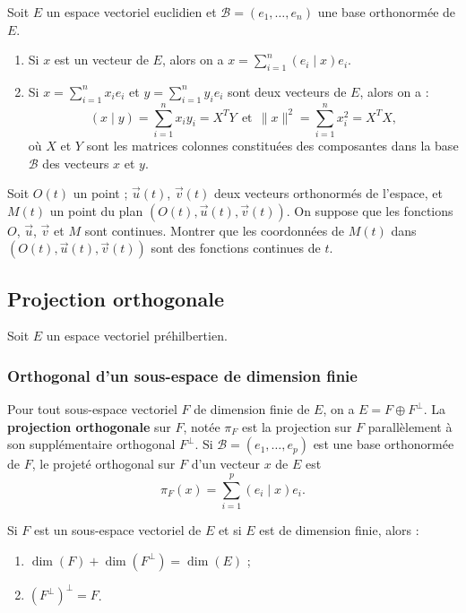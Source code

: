 \documentclass[french]{article}
\theoremstyle{plain}
\theoremstyle{definition}
\theoremstyle{remark}
\begin{document}
\begin{prop}
	Soit $E$ un espace vectoriel euclidien et $\mathcal{B}=(e_1,\ldots,e_n)$ une base orthonormée de $E$.
	\begin{enumerate}
		\item Si $x$ est un vecteur de $E$, alors on a $x=\displaystyle\sum_{i=1}^{n}(e_i\mid x)e_i$.
		\item Si $x=\displaystyle\sum_{i=1}^{n}x_ie_i$ et $y=\displaystyle\sum_{i=1}^{n}y_ie_i$ sont deux vecteurs de $E$, alors on a : $$(x\mid y)=\sum_{i=1}^{n}x_iy_i=X^TY\ \ \text{et}\ \ \lVert x\rVert^2=\sum_{i=1}^{n}x_i^2=X^TX,$$ où $X$ et $Y$ sont les matrices colonnes constituées des composantes dans la base $\mathcal{B}$ des vecteurs $x$ et $y$.
	\end{enumerate}
\end{prop}

\begin{exo}
	Soit $O(t)$ un point ; $\overrightarrow{u}(t)$, $\overrightarrow{v}(t)$ deux vecteurs orthonormés de l'espace, et $M(t)$ un point du plan $(O(t),\overrightarrow{u}(t),\overrightarrow{v}(t))$. On suppose que les fonctions $O$, $\overrightarrow{u}$, $\overrightarrow{v}$ et $M$ sont continues. Montrer que les coordonnées de $M(t)$ dans $(O(t),\overrightarrow{u}(t),\overrightarrow{v}(t))$ sont des fonctions continues de $t$.
\end{exo}

\subsection{Projection orthogonale}

Soit $E$ un espace vectoriel préhilbertien.

\subsubsection*{Orthogonal d'un sous-espace de dimension finie}

\begin{thm}
	Pour tout sous-espace vectoriel $F$ de dimension finie de $E$, on a $E=F\oplus F^\bot$. La \textbf{projection orthogonale} sur $F$, notée $\pi_F$ est la projection sur $F$ parallèlement à son supplémentaire orthogonal $F^\bot$. Si $\mathcal{B}=(e_1,\ldots,e_p)$ est une base orthonormée de $F$, le projeté orthogonal sur $F$ d'un vecteur $x$ de $E$ est $$\pi_F(x)=\sum_{i=1}^{p}(e_i\mid x)e_i.$$
\end{thm}

\begin{prop}
	Si $F$ est un sous-espace vectoriel de $E$ et si $E$ est de dimension finie, alors :
	\begin{enumerate}
		\item $\dim(F)+\dim(F^\bot)=\dim(E)$ ;
		\item $(F^\bot)^\bot=F$.
	\end{enumerate}
\end{prop}
\end{document}
